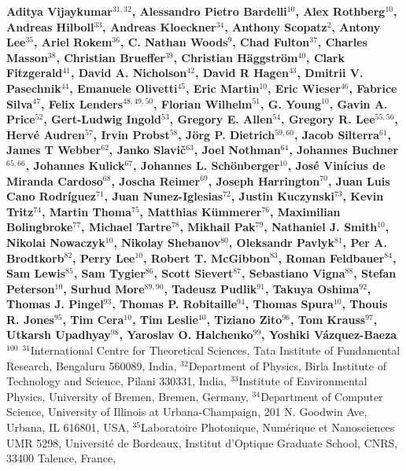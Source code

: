 
{\bfseries
Aditya Vijaykumar$^{31,32}$, 
Alessandro Pietro Bardelli$^{10}$, 
Alex Rothberg$^{10}$, 
Andreas Hilboll$^{33}$, 
Andreas Kloeckner$^{34}$, 
Anthony Scopatz$^{2}$, 
Antony Lee$^{35}$, 
Ariel Rokem$^{36}$, 
C. Nathan Woods$^{9}$, 
Chad Fulton$^{37}$, 
Charles Masson$^{38}$, 
Christian Brueffer$^{39}$, 
Christian H\"aggstr\"om$^{40}$, 
Clark Fitzgerald$^{41}$, 
David A. Nicholson$^{42}$, 
David R Hagen$^{43}$, 
Dmitrii V. Pasechnik$^{44}$, 
Emanuele Olivetti$^{45}$, 
Eric Martin$^{10}$, 
Eric Wieser$^{46}$, 
Fabrice Silva$^{47}$, 
Felix Lenders$^{48,49,50}$, 
Florian Wilhelm$^{51}$, 
G. Young$^{10}$, 
Gavin A. Price$^{52}$, 
Gert-Ludwig Ingold$^{53}$, 
Gregory E. Allen$^{54}$, 
Gregory R. Lee$^{55,56}$, 
Herv\'e Audren$^{57}$, 
Irvin Probst$^{58}$, 
J\"org P. Dietrich$^{59,60}$, 
Jacob Silterra$^{61}$, 
James T Webber$^{62}$, 
Janko Slavi\v{c}$^{63}$, 
Joel Nothman$^{64}$, 
Johannes Buchner$^{65,66}$, 
Johannes Kulick$^{67}$, 
Johannes L. Sch\"{o}nberger$^{10}$, 
Jos\'e Vin\'icius de Miranda Cardoso$^{68}$, 
Joscha Reimer$^{69}$, 
Joseph Harrington$^{70}$, 
Juan Luis Cano Rodr\'iguez$^{71}$, 
Juan Nunez-Iglesias$^{72}$, 
Justin Kuczynski$^{73}$, 
Kevin Tritz$^{74}$, 
Martin Thoma$^{75}$, 
Matthias K\"ummerer$^{76}$, 
Maximilian Bolingbroke$^{77}$, 
Michael Tartre$^{78}$, 
Mikhail Pak$^{79}$, 
Nathaniel J. Smith$^{10}$, 
Nikolai Nowaczyk$^{10}$, 
Nikolay Shebanov$^{80}$, 
Oleksandr Pavlyk$^{81}$, 
Per A. Brodtkorb$^{82}$, 
Perry Lee$^{10}$, 
Robert T. McGibbon$^{83}$, 
Roman Feldbauer$^{84}$, 
Sam Lewis$^{85}$, 
Sam Tygier$^{86}$, 
Scott Sievert$^{87}$, 
Sebastiano Vigna$^{88}$, 
Stefan Peterson$^{10}$, 
Surhud More$^{89,90}$, 
Tadeusz Pudlik$^{91}$, 
Takuya Oshima$^{92}$, 
Thomas J. Pingel$^{93}$, 
Thomas P. Robitaille$^{94}$, 
Thomas Spura$^{10}$, 
Thouis R. Jones$^{95}$, 
Tim Cera$^{10}$, 
Tim Leslie$^{10}$, 
Tiziano Zito$^{96}$, 
Tom Krauss$^{97}$, 
Utkarsh Upadhyay$^{98}$, 
Yaroslav O. Halchenko$^{99}$, 
Yoshiki V\'azquez-Baeza$^{100}$
}
\newline
\hfill \break
$^{31}$International Centre for Theoretical Sciences, Tata Institute of Fundamental Research, Bengaluru 560089, India, 
$^{32}$Department of Physics, Birla Institute of Technology and Science, Pilani 330331, India, 
$^{33}$Institute of Environmental Physics, University of Bremen, Bremen, Germany, 
$^{34}$Department of Computer Science, University of Illinois at Urbana-Champaign, 201 N. Goodwin Ave, Urbana, IL 616801, USA, 
$^{35}$Laboratoire Photonique, Num\'erique et Nanosciences UMR 5298, Universit\'e de Bordeaux, Institut d'Optique Graduate School, CNRS, 33400 Talence, France, 
